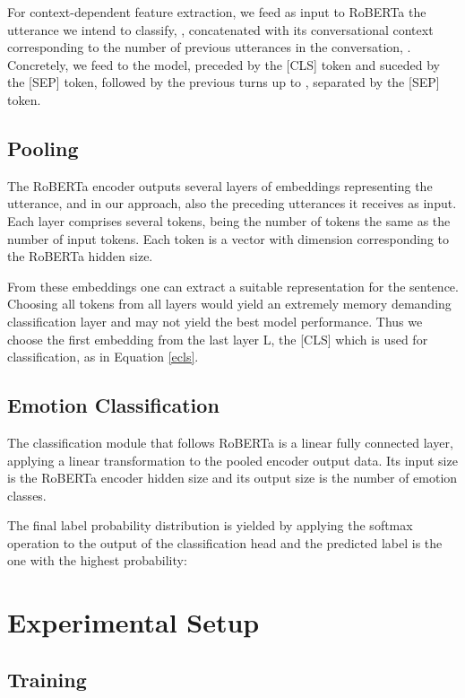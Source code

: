 \documentclass[11pt]{article}
\begin{document}
For context-dependent feature extraction, we feed as input to RoBERTa the utterance we intend to classify, , concatenated with its conversational context corresponding to the number  of previous utterances in the conversation, . Concretely, we feed  to the model, preceded by the [CLS] token and suceded by the [SEP] token, followed by the previous turns  up to , separated by the [SEP] token.








\subsection{Pooling}

The RoBERTa encoder outputs several layers of embeddings representing the utterance, and in our approach, also the preceding utterances it receives as input. Each layer comprises several tokens, being the number of tokens the same as the number of input tokens. Each token is a vector with dimension corresponding to the RoBERTa hidden size.

From these embeddings one can extract a suitable representation for the sentence. Choosing all tokens from all layers would yield an extremely memory demanding classification layer and may not yield the best model performance. Thus we choose the first embedding from the last layer L, the [CLS] which is used for classification, as in Equation \ref{ecls}. 


\subsection{Emotion Classification}
The classification module that follows RoBERTa is a linear fully connected layer, applying a linear transformation to the pooled encoder output data. Its input size is the RoBERTa encoder hidden size and its output size is the number of emotion classes.

The final label probability distribution is yielded by applying the softmax operation to the output of the classification head and the predicted label is the one with the highest probability:


\section{Experimental Setup}

\subsection{Training}
\end{document}
